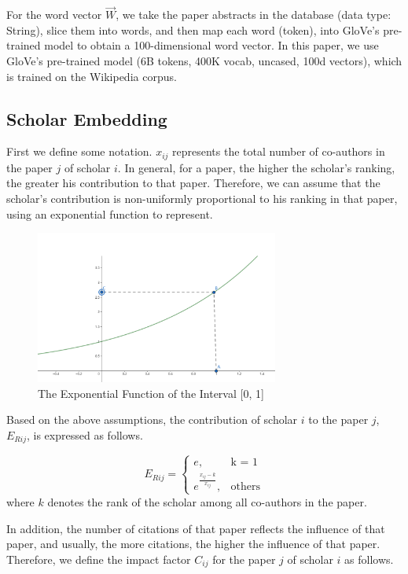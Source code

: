 \documentclass[a4paper]{jpconf}
\begin{document}
For the word vector \(\vec W\), we take the paper abstracts in the
database (data type: String), slice them into words, and then map each
word (token), into GloVe's pre-trained model to obtain a
100-dimensional word vector. In this paper, we use GloVe's
pre-trained model (6B tokens, 400K vocab, uncased, 100d vectors), which
is trained on the Wikipedia corpus.


\subsection{Scholar Embedding}
First we define some notation. \(x_{ij}\) represents the total number of
co-authors in the paper \(j\) of scholar \(i\). In general, for a
paper, the higher the scholar's ranking, the greater his
contribution to that paper. Therefore, we can assume that the
scholar's contribution is non-uniformly proportional to his ranking in
that paper, using an exponential function to represent.

\begin{figure}[htbp] %
\centering %
\includegraphics[width=8cm]{img/exponential.png}
\caption{The Exponential Function of the Interval [0, 1]} %
\label{exponential} %
\end{figure}

Based on the above assumptions, the contribution of scholar \(i\) to the
paper \(j\), \(E_{Rij}\), is expressed as follows.

\begin{equation}\label{eq:Er}
    E_{Rij}= \begin{cases} e,& \text{k = 1} \\ e^{\frac{x_{ij}-k}{x_{ij}}}, & \text{others} \end{cases}
\end{equation}
where \(k\) denotes the rank of the scholar among all co-authors in the
paper.

In addition, the number of citations of that paper reflects the
influence of that paper, and usually, the more citations, the
higher the influence of that paper. Therefore, we define the impact
factor \(C_{ij}\) for the paper \(j\) of scholar \(i\) as follows.
\end{document}
